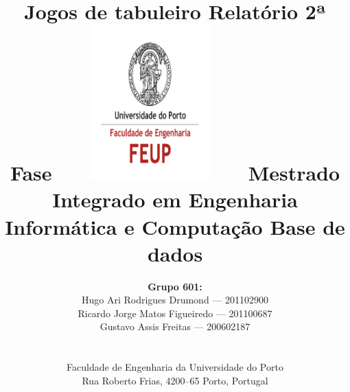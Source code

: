 \documentclass[a4paper]{article}
\begin{document}
\setlength{\textwidth}{16cm}
\setlength{\textheight}{22cm}

\title{\Huge\textbf{Jogos de tabuleiro}\linebreak\linebreak\linebreak
\Large\textbf{Relatório 2ª Fase}\linebreak\linebreak
\includegraphics[height=6cm, width=7cm]{feup.pdf}\linebreak \linebreak
\Large{Mestrado Integrado em Engenharia Informática e Computação} \linebreak \linebreak
\Large{Base de dados}\linebreak
}

\author{\textbf{Grupo 601:}\\ Hugo Ari Rodrigues Drumond --- 201102900 \\  Ricardo Jorge Matos Figueiredo --- 201100687 \\ Gustavo Assis Freitas --- 200602187\\\linebreak\linebreak \\
 \\ Faculdade de Engenharia da Universidade do Porto \\ Rua Roberto Frias, 4200--65 Porto, Portugal \linebreak\linebreak\linebreak
\linebreak\linebreak\vspace{1cm}}
\maketitle
\thispagestyle{empty}
\end{document}
